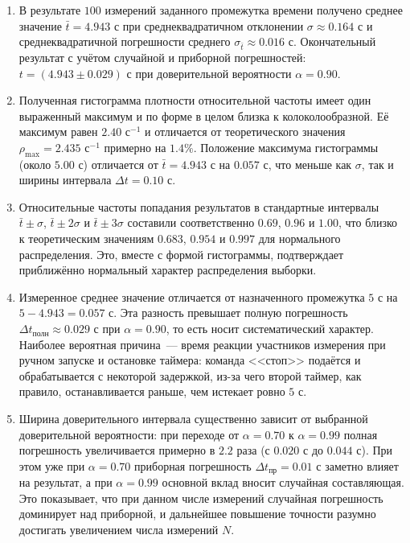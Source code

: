 \documentclass[12pt]{article}
\begin{document}
	\begin{enumerate}
		\item В результате $100$ измерений заданного промежутка времени получено среднее значение $\bar t = 4.943$ с при среднеквадратичном отклонении $\sigma \approx 0.164$ с и среднеквадратичной погрешности среднего $\sigma_{\bar t} \approx 0.016$ с. Окончательный результат с учётом случайной и приборной погрешностей: $t = (4.943 \pm 0.029)$ с при доверительной вероятности $\alpha = 0.90$.

		\item Полученная гистограмма плотности относительной частоты имеет один выраженный максимум и по форме в целом близка к колоколообразной. Её максимум равен $2.40$ с$^{-1}$ и отличается от теоретического значения $\rho_{\max} = 2.435$ с$^{-1}$ примерно на $1.4\%$. Положение максимума гистограммы (около $5.00$ с) отличается от $\bar t = 4.943$ с на $0.057$ с, что меньше как $\sigma$, так и ширины интервала $\Delta t = 0.10$ с.

		\item Относительные частоты попадания результатов в стандартные интервалы $\bar t \pm \sigma$, $\bar t \pm 2 \sigma$ и $\bar t \pm 3 \sigma$ составили соответственно $0.69$, $0.96$ и $1.00$, что близко к теоретическим значениям $0.683$, $0.954$ и $0.997$ для нормального распределения. Это, вместе с формой гистограммы, подтверждает приближённо нормальный характер распределения выборки.

		\item Измеренное среднее значение отличается от назначенного промежутка $5$ с на $5 - 4.943 = 0.057$ с. Эта разность превышает полную погрешность $\Delta t_{\text{полн}} \approx 0.029$ с при $\alpha = 0.90$, то есть носит систематический характер. Наиболее вероятная причина~--- время реакции участников измерения при ручном запуске и остановке таймера: команда <<стоп>> подаётся и обрабатывается с некоторой задержкой, из-за чего второй таймер, как правило, останавливается раньше, чем истекает ровно $5$ с.

		\item Ширина доверительного интервала существенно зависит от выбранной доверительной вероятности: при переходе от $\alpha = 0.70$ к $\alpha = 0.99$ полная погрешность увеличивается примерно в $2.2$ раза (с $0.020$ с до $0.044$ с). При этом уже при $\alpha = 0.70$ приборная погрешность $\Delta t_{\text{пр}} = 0.01$ с заметно влияет на результат, а при $\alpha = 0.99$ основной вклад вносит случайная составляющая. Это показывает, что при данном числе измерений случайная погрешность доминирует над приборной, и дальнейшее повышение точности разумно достигать увеличением числа измерений $N$.
	\end{enumerate}
\end{document}
